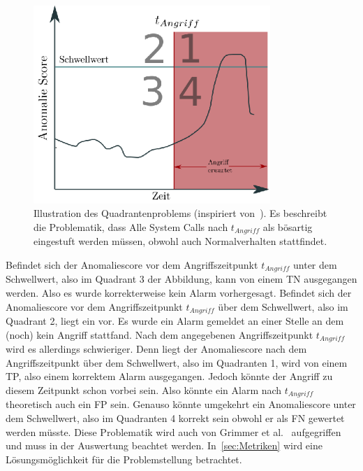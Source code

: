                     \begin{figure}[ht]
                        \centering
                        \includegraphics[width=0.8\textwidth]{images/q_problem.eps}
                        \caption{Illustration des Quadrantenproblems (inspiriert von~\cite{IDSTHREADGRIMMER2021}).
                        Es beschreibt die Problematik, dass Alle System Calls nach $t_{Angriff}$ als bösartig eingestuft werden müssen, obwohl auch Normalverhalten stattfindet.}
                        \label{fig:quadrant}
                    \end{figure}

                    Befindet sich der Anomaliescore vor dem Angriffszeitpunkt $t_{Angriff}$ unter dem Schwellwert, also im Quadrant 3 der Abbildung, kann von einem \ac{TN} ausgegangen werden.
                    Also es wurde korrekterweise kein Alarm vorhergesagt.
                    Befindet sich der Anomaliescore vor dem Angriffszeitpunkt $t_{Angriff}$ über dem Schwellwert, also im Quadrant 2, liegt ein  vor.
                    Es wurde ein Alarm gemeldet an einer Stelle an dem (noch) kein Angriff stattfand.
                    Nach dem angegebenen Angriffszeitpunkt $t_{Angriff}$ wird es allerdings schwieriger.
                    Denn liegt der Anomaliescore nach dem Angriffszeitpunkt über dem Schwellwert, also im Quadranten 1, wird von einem \ac{TP}, also einem korrektem Alarm ausgegangen.
                    Jedoch könnte der Angriff zu diesem Zeitpunkt schon vorbei sein.
                    Also könnte ein Alarm nach $t_{Angriff}$ theoretisch auch ein \ac{FP} sein. 
                    Genauso könnte umgekehrt ein Anomaliescore unter dem Schwellwert, also im Quadranten 4 korrekt sein obwohl er als \ac{FN} gewertet werden müsste.
                    Diese Problematik wird auch von Grimmer et al.~\cite{IDSTHREADGRIMMER2021} aufgegriffen und muss in der Auswertung beachtet werden. 
                    In~\autoref{sec:Metriken} wird eine Lösungsmöglichkeit für die Problemstellung betrachtet.

